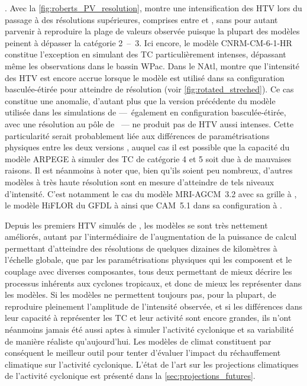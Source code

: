 \documentclass[../main.tex]{subfiles}
\begin{document}
\cite{atkinson_tropical_1977}. Avec la \cref{fig:roberts_PV_resolution}, \cite{roberts_impact_2020} montre une intensification des HTV lors du passage à des
résolutions supérieures, comprises entre  et , sans pour autant parvenir à reproduire la plage de valeurs observée puisque la plupart des modèles
peinent à dépasser la catégorie \num{2}~--~\num{3}. Ici encore, le modèle CNRM-CM-6-1-HR constitue l'exception en simulant des TC particulièrement intenses,
dépassant même les observations dans le bassin WPac. Dans le NAtl, \cite{chauvin_future_2020} montre que l'intensité des HTV est encore accrue lorsque le modèle
est utilisé dans sa configuration basculée-étirée pour atteindre  de résolution (voir \cref{fig:rotated_streched}). Ce cas constitue une anomalie,
d'autant plus que la version précédente du modèle utilisée dans les simulations de \cite{daloz_impact_2012} ---~également en configuration basculée-étirée, avec
une résolution au pôle de ~--- ne produit pas de HTV aussi intenses. Cette particularité serait probablement liée aux différences de paramétrisations
physiques entre les deux versions \parencite{chauvin_future_2020}, auquel cas il est possible que la capacité du modèle ARPEGE à simuler des TC de catégorie
\num{4} et \num{5} soit due à de mauvaises raisons. Il est néanmoins à noter que, bien qu'ils soient peu nombreux, d'autres modèles à très haute résolution sont
en mesure d'atteindre de tels niveaux d'intensité. C'est notamment le cas du modèle MRI-AGCM~3.2 avec sa grille à  \parencite{murakami_future_2012}, le
modèle HiFLOR du GFDL à  \parencite{murakami_simulation_2015} ainsi que CAM~5.1 dans sa configuration à  \parencite{wehner_effect_2014}.

Depuis les premiers HTV simulés de \cite{manabe_tropical_1970}, les modèles se sont très nettement améliorés, autant par l'intermédiaire de l'augmentation de la
puissance de calcul permettant d'atteindre des résolutions de quelques dizaines de kilomètres à l'échelle globale, que par les paramétrisations physiques qui
les composent et le couplage avec diverses composantes, tous deux permettant de mieux décrire les processus inhérents aux cyclones tropicaux, et donc de mieux
les représenter dans les modèles. Si les modèles ne permettent toujours pas, pour la plupart, de reproduire pleinement l'amplitude de l'intensité observée, et
si les différences dans leur capacité à représenter les TC et leur activité sont encore grandes, ils n'ont néanmoins jamais été aussi aptes à simuler l'activité
cyclonique et sa variabilité de manière réaliste qu'aujourd'hui. Les modèles de climat constituent par conséquent le meilleur outil pour tenter d'évaluer
l'impact du réchauffement climatique sur l'activité cyclonique. L'état de l'art sur les projections climatiques de l'activité cyclonique est présenté dans la
\cref{sec:projections_futures}.
\end{document}
